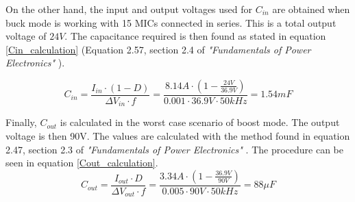On the other hand, the input and output voltages used for $C_{in}$ are obtained when buck mode is working with 15 MICs connected in series. This is a total output voltage of $24 V$.
The capacitance required is then found as stated in equation \ref{Cin_calculation} (Equation 2.57, section 2.4 of \textit{"Fundamentals of Power Electronics"} \cite{Erickson}).

\begin{equation} \label{Cin_calculation}
C_{in} = \frac{I_{in} \cdot (1 - D)}{\Delta V_{in} \cdot f} = \frac{8.14 A \cdot ( 1 - \frac{24 V}{36.9 V})}{0.001 \cdot 36.9 V \cdot 50 kHz} = 1.54 mF
\end{equation}

Finally, $C_{out}$ is calculated in the worst case scenario of boost mode. The output voltage is then 90V. The values are calculated with the method found in equation 2.47, section 2.3 of \textit{"Fundamentals of Power Electronics"} \cite{Erickson}. The procedure can be seen in equation \ref{Cout_calculation}.
\begin{equation} \label{Cout_calculation}
C_{out} = \frac{I_{out} \cdot D}{\Delta V_{out} \cdot f} = \frac{3.34 A \cdot ( 1 - \frac{36.9 V}{90 V})}{0.005 \cdot 90 V \cdot 50 kHz} = 88 \mu F
\end{equation}

   
